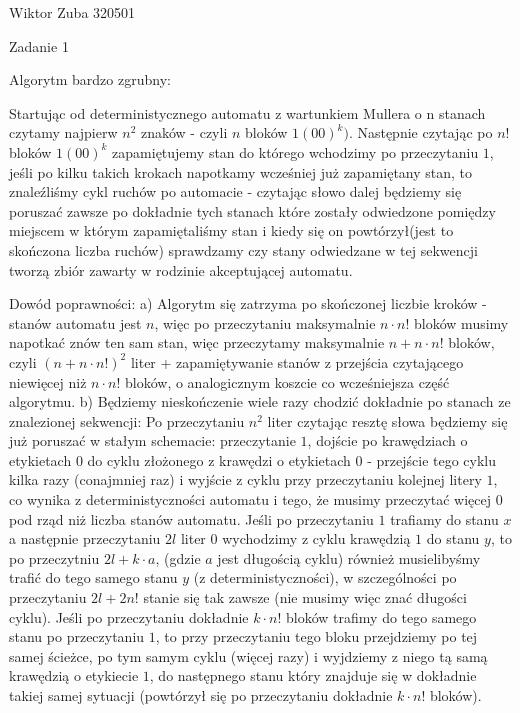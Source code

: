 \documentclass{article}
\begin{document}
Wiktor Zuba 320501\newline

Zadanie 1\newline

Algorytm bardzo zgrubny:

Startując od deterministycznego automatu z wartunkiem Mullera o n stanach
czytamy najpierw $n^2$ znaków - czyli $n$ bloków $1(00)^k)$. Następnie czytając po $n!$ bloków $1(00)^k$
zapamiętujemy stan do którego wchodzimy po przeczytaniu $1$,
jeśli po kilku takich krokach napotkamy wcześniej już zapamiętany stan, to znaleźliśmy cykl ruchów po automacie -
czytając słowo dalej będziemy się poruszać zawsze po dokładnie tych stanach które zostały odwiedzone pomiędzy miejscem w którym zapamiętaliśmy
stan i kiedy się on powtórzył(jest to skończona liczba ruchów) sprawdzamy czy stany odwiedzane w tej sekwencji tworzą
zbiór zawarty w rodzinie akceptującej automatu.\newline\newline

Dowód poprawności:\newline
a) Algorytm się zatrzyma po skończonej liczbie kroków - stanów automatu jest $n$, więc po przeczytaniu maksymalnie $n\cdot n!$
bloków musimy napotkać znów ten sam stan, więc przeczytamy maksymalnie $n+n\cdot n!$ bloków, czyli $(n+n\cdot n!)^2$ liter +
zapamiętywanie stanów z przejścia czytającego niewięcej niż $n\cdot n!$ bloków, o analogicznym koszcie co wcześniejsza część algorytmu.\newline
b) Będziemy nieskończenie wiele razy chodzić dokładnie po stanach ze znalezionej sekwencji:\newline
Po przeczytaniu $n^2$ liter czytając resztę słowa będziemy się już poruszać w stałym schemacie:
przeczytanie $1$, dojście po krawędziach o etykietach $0$ do cyklu złożonego z krawędzi o etykietach $0$ - przejście tego cyklu kilka razy
(conajmniej raz) i wyjście z cyklu przy przeczytaniu kolejnej litery $1$, co wynika z deterministyczności automatu i tego,
że musimy przeczytać więcej $0$ pod rząd niż liczba stanów automatu.
Jeśli po przeczytaniu $1$ trafiamy do stanu $x$ a następnie przeczytaniu $2l$ liter $0$ wychodzimy z cyklu krawędzią $1$ do stanu $y$,
to po przeczytniu $2l+k\cdot a$, (gdzie $a$ jest długością cyklu) również musielibyśmy trafić do tego samego stanu $y$ (z deterministyczności),
w szczególności po przeczytaniu $2l+2n!$ stanie się tak zawsze (nie musimy więc znać długości cyklu).
Jeśli po przeczytaniu dokładnie $k\cdot n!$ bloków trafimy do tego samego stanu po przeczytaniu $1$,
to przy przeczytaniu tego bloku przejdziemy po tej samej ścieżce, po tym samym cyklu (więcej razy) i wyjdziemy z niego tą samą krawędzią o etykiecie $1$,
do następnego stanu który znajduje się w dokładnie takiej samej sytuacji (powtórzył się po przeczytaniu dokładnie $k\cdot n!$ bloków).
\end{document}

